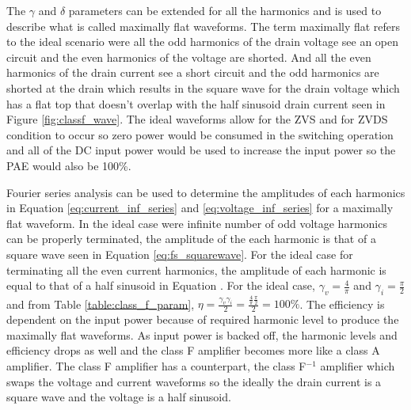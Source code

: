 The $\gamma$ and $\delta$ parameters can be extended for all the harmonics and is used to describe what is called maximally flat waveforms. The term maximally flat refers to the ideal scenario were all the odd harmonics of the drain voltage see an open circuit and the even harmonics of the voltage are shorted. And all the even harmonics of the drain current see a short circuit and the odd harmonics are shorted at the drain which results in the square wave for the drain voltage which has a flat top that doesn't overlap with the half sinusoid drain current seen in Figure \ref{fig:classf_wave}. The ideal waveforms allow for the ZVS and for ZVDS condition to occur so zero power would be consumed in the switching operation and all of the DC input power would be used to increase the input power so the PAE would also be 100\%.


Fourier series analysis can be used to determine the amplitudes of each harmonics in Equation \ref{eq:current_inf_series} and \ref{eq:voltage_inf_series} for a maximally flat waveform. In the ideal case were infinite number of odd voltage harmonics can be properly terminated, the amplitude of the each harmonic is that of a square wave seen in Equation \ref{eq:fs_squarewave}. For the ideal case for terminating all the even current harmonics, the amplitude of each harmonic is equal to that of a half sinusoid in Equation . For the ideal case, $\gamma_v = \frac{4}{\pi}$ and $\gamma_i = \frac{\pi}{2}$ and from Table \ref{table:class_f_param}, $\eta = \frac{\gamma_v \gamma_i}{2} = \frac{ \frac{4}{\pi} \frac{\pi}{2} }{2} = 100\%$. The efficiency is dependent on the input power because of required harmonic level to produce the maximally flat waveforms. As input power is backed off, the harmonic levels and efficiency drops as well and the class F amplifier becomes more like a class A amplifier. The class F amplifier has a counterpart, the class F$^{-1}$ amplifier which swaps the voltage and current waveforms so the ideally the drain current is a square wave and the voltage is a half sinusoid.

